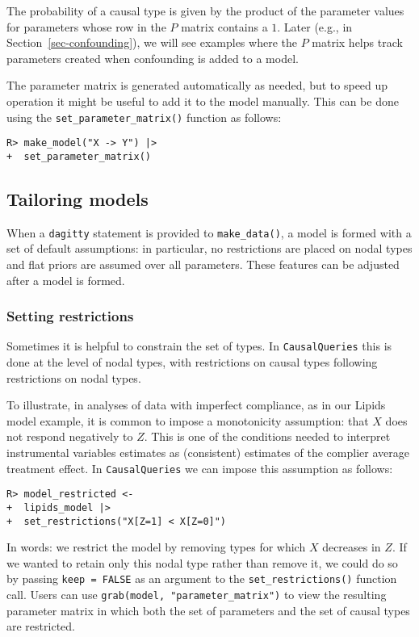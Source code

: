 \documentclass[
  11pt,
  article]{jss}
\begin{document}
The probability of a causal type is given by the product of the
parameter values for parameters whose row in the \(P\) matrix contains a
\(1\). Later (e.g., in Section~\ref{sec-confounding}), we will see
examples where the \(P\) matrix helps track parameters created when
confounding is added to a model.

The parameter matrix is generated automatically as needed, but to speed
up operation it might be useful to add it to the model manually. This
can be done using the \texttt{set\_parameter\_matrix()} function as
follows:

\begin{verbatim}
R> make_model("X -> Y") |> 
+  set_parameter_matrix()
\end{verbatim}

\subsection{Tailoring models}\label{tailoring-models}

When a \texttt{dagitty} statement is provided to \texttt{make\_data()},
a model is formed with a set of default assumptions: in particular, no
restrictions are placed on nodal types and flat priors are assumed over
all parameters. These features can be adjusted after a model is formed.

\subsubsection{Setting restrictions}\label{restrictions}

Sometimes it is helpful to constrain the set of types. In
\texttt{CausalQueries} this is done at the level of nodal types, with
restrictions on causal types following restrictions on nodal types.

To illustrate, in analyses of data with imperfect compliance, as in our
Lipids model example, it is common to impose a monotonicity assumption:
that \(X\) does not respond negatively to \(Z\). This is one of the
conditions needed to interpret instrumental variables estimates as
(consistent) estimates of the complier average treatment effect. In
\texttt{CausalQueries} we can impose this assumption as follows:

\begin{verbatim}
R> model_restricted <- 
+  lipids_model |> 
+  set_restrictions("X[Z=1] < X[Z=0]")
\end{verbatim}

In words: we restrict the model by removing types for which \(X\)
decreases in \(Z\). If we wanted to retain only this nodal type rather
than remove it, we could do so by passing \texttt{keep\ =\ FALSE} as an
argument to the \texttt{set\_restrictions()} function call. Users can
use \texttt{grab(model,\ "parameter\_matrix")} to view the resulting
parameter matrix in which both the set of parameters and the set of
causal types are restricted.
\end{document}
